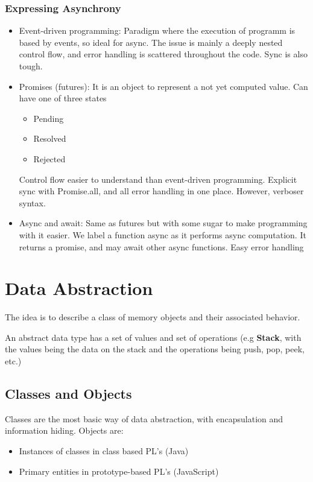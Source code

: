 \documentclass{article}
\begin{document}
\subsubsection{Expressing Asynchrony}
\begin{itemize}
  \item Event-driven programming: Paradigm where the execution of programm is based by events, so ideal for async. The issue is mainly a deeply nested control flow, and error handling is scattered throughout the code. Sync is also tough.
  \item Promises (futures): It is an object to represent a not yet computed value. Can have one of three states
  \begin{itemize}
    \item Pending
    \item Resolved
    \item Rejected
  \end{itemize}
  Control flow easier to understand than event-driven programming. Explicit sync with Promise.all, and all error handling in one place. However, verboser syntax.
  \item Async and await: Same as futures but with some sugar to make programming with it easier. We label a function async as it performs async computation. It returns a promise, and may await other async functions. Easy error handling
\end{itemize}

\section{Data Abstraction}
The idea is to describe a class of memory objects and their associated behavior.

An abstract data type has a set of values and set of operations (e.g \textbf{Stack}, with the values being the data on the stack and the operations being push, pop, peek, etc.)

\subsection{Classes and Objects}
Classes are the most basic way of data abstraction, with encapsulation and information hiding. Objects are:
\begin{itemize}
  \item Instances of classes in class based PL's (Java)
  \item Primary entities in prototype-based PL's (JavaScript)
\end{itemize}
\end{document}
